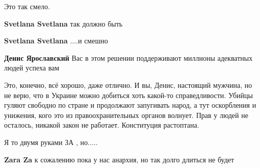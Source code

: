 \begin{itemize}
Это так смело.

\begin{itemize}
 
\textbf{Svetlana Svetlana} так должно быть

 
\textbf{Svetlana Svetlana} ....и смешно

 
\textbf{Денис Ярославский} Вас в этом решении поддерживают миллионы адекватных людей успеха вам
\end{itemize}


Это, конечно, всё хорошо, даже отлично. И вы, Денис, настоящий мужчина, но не
верю, что в Украине можно добиться хоть какой-то справедливости. Убийцы гуляют
свободно по стране и продолжают запугивать народ, а тут оскорбления и унижения,
кого это из правоохранительных органов волнует. Прав у людей не осталось,
никакой закон не работает. Конституция растоптана.

Я то двумя руками ЗА , но.....

\begin{itemize}
 
\textbf{Zara Za} к сожалению пока у нас анархия, но так долго длиться не будет

 

\end{itemize}
\end{itemize}

